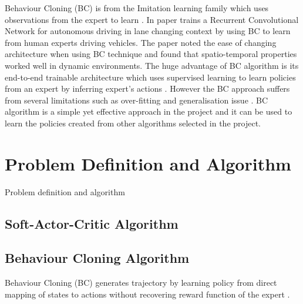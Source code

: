\documentclass{svproc}
\begin{document}

Behaviour Cloning (BC) is from the Imitation learning family which uses observations from the expert to learn \cite{torabi2018behavioral}. In paper \cite{saksena2019towards} trains a Recurrent Convolutional Network for autonomous driving in lane changing context by using BC to learn from human experts driving vehicles. The paper noted the ease of changing architecture when using BC technique and found that spatio-temporal properties worked well in dynamic environments. The huge advantage of BC algorithm is its end-to-end trainable architecture which uses supervised learning to learn policies from an expert by inferring expert's actions \cite{codevilla2019exploring}\cite{farag2018behavior}\cite{ly2020learning}\cite{saksena2019towards}. However the BC approach suffers from several limitations such as over-fitting and generalisation issue \cite{codevilla2019exploring}. BC algorithm is a simple yet effective approach in the project and it can be used to learn the policies created from other algorithms selected in the project.

%

\section{Problem Definition and Algorithm}
Problem definition and algorithm

\subsection{Soft-Actor-Critic Algorithm}

\subsection{Behaviour Cloning Algorithm}
Behaviour Cloning (BC) generates trajectory by learning policy from direct mapping of states to actions without recovering reward function of the expert \cite{osa2018algorithmic}.
\end{document}
